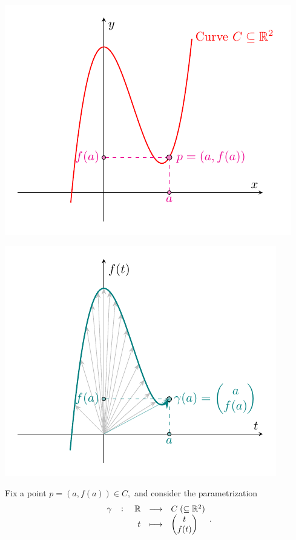 \documentclass[11pt,openany]{article}
\begin{document}
\begin{center}
\begin{minipage}{.49\textwidth}
	\includegraphics[scale=1]{tangent-space-1.pdf}
\end{minipage}\hfill
\begin{minipage}{.49\textwidth}
	\includegraphics[scale=1]{tangent-space-1-1.pdf}
\end{minipage}
\end{center}
Fix a point $p=(a,f(a))\in C,$ and consider the parametrization \[
\fullfunction{\gamma}{\mathbb{R}}{C\;(\subseteq\R^2)}{t}{
\begin{pmatrix}
	t\\ f(t)
\end{pmatrix}
}.
\]
\end{document}
